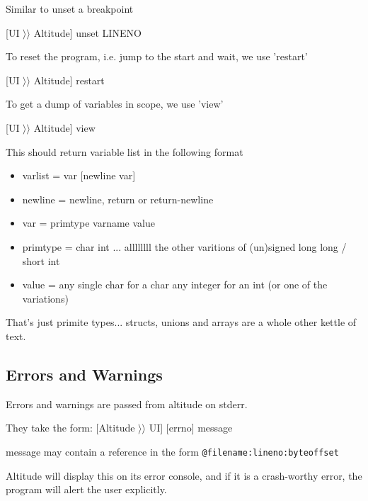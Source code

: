 \documentclass[10pt,a4paper]{report}
\begin{document}
Similar to unset a breakpoint

[UI $\rangle\rangle$ Altitude] unset LINENO

To reset the program, i.e. jump to the start and wait, we use 'restart'

[UI $\rangle\rangle$ Altitude] restart

To get a dump of variables in scope, we use 'view'

[UI $\rangle\rangle$ Altitude] view

This should return variable list in the following format
\begin{itemize}
\item varlist = var [newline var]
\item newline = newline, return or return-newline
\item var = primtype varname value
\item primtype = char  int  ... allllllll the other varitions of (un)signed long long / short int
\item value = any single char for a char  any integer for an int (or one of the variations)
\end{itemize}

That's just primite types... structs, unions and arrays are a whole other kettle of text.

\subsection{Errors and Warnings}

Errors and warnings are passed from altitude on stderr.

They take the form:
[Altitude $\rangle\rangle$ UI] [errno] message

message may contain a reference in the form \lstinline{@filename:lineno:byteoffset}


Altitude will display this on its error console, and if it is a crash-worthy error, the program will alert the user explicitly.
\end{document}
